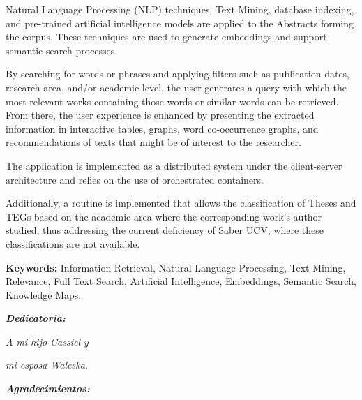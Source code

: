 Natural Language Processing (NLP) techniques, Text Mining, database indexing, and pre-trained artificial intelligence models are applied to the Abstracts forming the corpus. These techniques are used to generate embeddings and support semantic search processes.

By searching for words or phrases and applying filters such as publication dates, research area, and/or academic level, the user generates a query with which the most relevant works containing those words or similar words can be retrieved. From there, the user experience is enhanced by presenting the extracted information in interactive tables, graphs, word co-occurrence graphs, and recommendations of texts that might be of interest to the researcher.

The application is implemented as a distributed system under the client-server architecture and relies on the use of orchestrated containers.

Additionally, a routine is implemented that allows the classification of Theses and TEGs based on the academic area where the corresponding work's author studied, thus addressing the current deficiency of Saber UCV, where these classifications are not available.

\vspace*{2cm}

\textbf{Keywords:} Information Retrieval, Natural Language Processing, Text Mining, Relevance, Full Text Search, Artificial Intelligence, Embeddings, Semantic Search, Knowledge Maps.


\thispagestyle{empty}




\setlength{\abovedisplayskip}{-5pt}
\setlength{\abovedisplayshortskip}{-5pt}
\thispagestyle{empty}

\newpage
\begin{center}
\large{\textbf{\emph{\Huge{Dedicatoria:}}}}
\end{center}
\thispagestyle{empty}
\vspace*{5cm}
\thispagestyle{empty}
\begin{center} \Large \emph{A  mi hijo Cassiel y  } \end{center}
\vspace*{1cm}
\begin{center} \Large \emph{mi esposa Waleska.} \end{center}



\newpage
\begin{center}
\large{\textbf{\emph{\Huge{Agradecimientos:}}}}
\end{center}
\thispagestyle{empty}
\vspace*{2cm}
\thispagestyle{empty}

